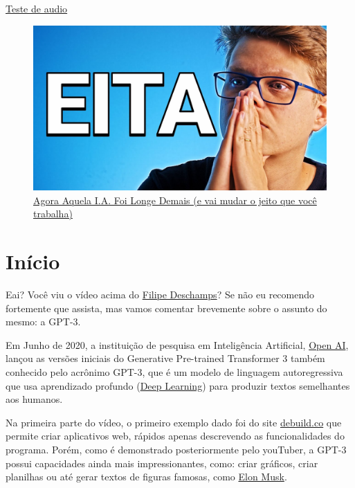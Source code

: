 \documentclass[12pt]{article}
\begin{document}
    \begin{center}

        \href{./Capitulo02.mp3}{Teste de audio}

    \end{center}

    \newpage    
    \begin{figure}[htp]
        \centering
        \includegraphics[scale=0.3]{maxresdefault.jpg}
        \caption{\href{https://youtu.be/pbVwH8o837A}{Agora Aquela I.A. Foi Longe Demais (e vai mudar o jeito que você trabalha)}}
    \end{figure}
    
    \section{Início} \label{sec:gpt-3}

    Eai? Você viu o vídeo acima do \href{https://br.linkedin.com/in/filipedeschamps}{Filipe Deschamps}? 
    Se não eu recomendo fortemente que assista, mas vamos comentar brevemente sobre o assunto 
    do mesmo: a GPT-3.

    Em Junho de 2020, a instituição de pesquisa em Inteligência Artificial,
    \href{https://openai.com/}{Open AI}, lançou as versões iniciais do Generative Pre-trained Transformer 3 também conhecido 
    pelo acrônimo GPT-3, que é um modelo de linguagem autoregressiva que usa 
    aprendizado profundo (\href{https://www.sas.com/pt_br/insights/analytics/deep-learning.html}
    {Deep Learning}) para produzir textos semelhantes aos humanos.

    Na primeira parte do vídeo, o primeiro exemplo dado foi do site \href{https://debuild.co/}{debuild.co} 
    que permite criar aplicativos web, rápidos apenas descrevendo as funcionalidades do programa. 
    Porém, como é demonstrado posteriormente pelo youTuber, a GPT-3 possui capacidades ainda mais 
    impressionantes, como: criar gráficos, criar planilhas ou até gerar textos de 
    figuras famosas, como \href{https://pt.wikipedia.org/wiki/Elon_Musk}{Elon Musk}.
\end{document}

